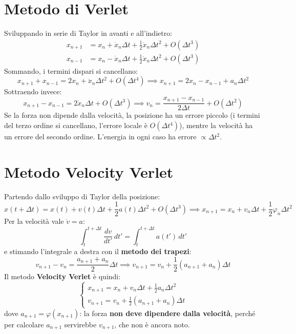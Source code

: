 \documentclass[11pt, a4paper, openright]{book}
\theoremstyle{plain}
\theoremstyle{definition}
\theoremstyle{remark}
\begin{document}
\section{Metodo di Verlet}
Sviluppando in serie di Taylor in avanti e all'indietro:
\begin{align}
    x_{n + 1} &= x_n + \dot{x}_n\Delta t + \frac{1}{2}\ddot{x}_n\Delta t^2 + O(\Delta t^3) \\
    x_{n - 1} &= x_n - \dot{x}_n\Delta t + \frac{1}{2}\ddot{x}_n\Delta t^2 + O(\Delta t^3)
\end{align}
Sommando, i termini dispari si cancellano:
\begin{equation}
    x_{n + 1} + x_{n - 1} = 2x_n + \ddot{x}_n\Delta t^2 + O(\Delta t^4) \implies \boxed{x_{n + 1} = 2x_n - x_{n - 1} + a_n\Delta t^2}
\end{equation}
Sottraendo invece:
\begin{equation}
    x_{n + 1} - x_{n - 1} = 2\dot{x}_n\Delta t + O(\Delta t^3) \implies v_n = \frac{x_{n + 1} - x_{n - 1}}{2\Delta t} + O(\Delta t^2)
\end{equation}
Se la forza non dipende dalla velocità, la posizione ha un errore piccolo (i termini del terzo ordine si cancellano, l'errore locale è $O(\Delta t^4)$), mentre la velocità ha un errore del secondo ordine. L'energia in ogni caso ha errore $\propto \Delta t^2$.

\section{Metodo Velocity Verlet}
Partendo dallo sviluppo di Taylor della posizione:
\begin{equation}
    x(t + \Delta t) = x(t) + v(t)\Delta t + \frac{1}{2}a(t)\Delta t^2 + O(\Delta t^3) \implies x_{n + 1} = x_n + v_n\Delta t + \frac{1}{2}\varphi_n\Delta t^2
\end{equation}
Per la velocità vale $\dot{v} = a$:
\begin{equation}
    \int_t^{t + \Delta t}\frac{dv}{dt'}\,dt' = \int_t^{t + \Delta t}a(t')\,dt'
\end{equation}
e stimando l'integrale a destra con il \textbf{metodo dei trapezi}:
\begin{equation}
    v_{n + 1} - v_n = \frac{a_{n + 1} + a_n}{2}\Delta t \implies v_{n + 1} = v_n + \frac{1}{2}\left(a_{n + 1} + a_n\right)\Delta t
\end{equation}
Il metodo \textbf{Velocity Verlet} è quindi:
\begin{equation}
    \boxed{\begin{cases}
        x_{n + 1} = x_n + v_n\Delta t + \frac{1}{2}a_n\Delta t^2 \\
        v_{n + 1} = v_n + \frac{1}{2}\left(a_{n + 1} + a_n\right)\Delta t
    \end{cases}}
\end{equation}
dove $a_{n + 1} = \varphi(x_{n + 1})$: la forza \textbf{non deve dipendere dalla velocità}, perché per calcolare $a_{n + 1}$ servirebbe $v_{n + 1}$, che non è ancora noto.
\end{document}
